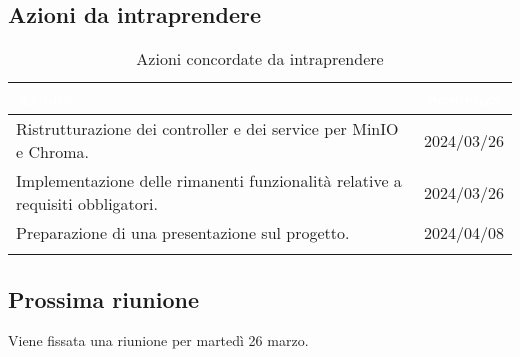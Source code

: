 \subsection{Azioni da intraprendere} \label{subsec:action}

{
\setlength{\tabcolsep}{10pt}
\renewcommand{\arraystretch}{1.5}
\begin{xltabular}{\textwidth}{| X | c |}
    \hline
     \textbf{\textcolor{white}{Azione}} & \textbf{\textcolor{white}{Scadenza}} \\
    \hline
    \endhead
   Ristrutturazione dei controller e dei service per MinIO e Chroma. & 2024/03/26\\
    \hline
    Implementazione delle rimanenti funzionalità relative a requisiti obbligatori. & 2024/03/26\\
    \hline
    Preparazione di una presentazione sul progetto. & 2024/04/08\\
    \hline
     \caption{Azioni concordate da intraprendere}
    \label{tab:reqimp}
\end{xltabular}
}


\subsection{Prossima riunione} \label{subsec:riunione}
Viene fissata una riunione per martedì 26 marzo.
\newpage    
